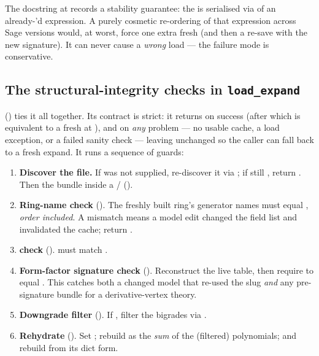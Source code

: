 \begin{note}
The docstring at  records a stability
guarantee: the  is serialised via  of an
already-'d  expression. A purely cosmetic
re-ordering of that expression across Sage versions would, at worst, force one
extra fresh  (and then a re-save with the new signature). It can
never cause a \emph{wrong} load --- the failure mode is conservative.
\end{note}

\subsection{The structural-integrity checks in \texttt{load\_expand}}

 () ties it all
together. Its contract is strict: it returns  on success (after which
 is equivalent to a fresh  at ), and
 on \emph{any} problem --- no usable cache, a load exception, or a
failed sanity check --- leaving  unchanged so the caller can fall back
to a fresh expand. It runs a sequence of guards:

\begin{enumerate}
  \item \textbf{Discover the file.} If  was not supplied,
        re-discover it via ; if still
        , return . Then  the bundle
        inside a / ().
  \item \textbf{Ring-name check} (). The freshly built ring's
        generator names must equal ,
        \emph{order included}. A mismatch means a model edit changed the field
        list and invalidated the cache; return .
  \item \textbf{ check} ().
         must match .
  \item \textbf{Form-factor signature check} (). Reconstruct the
        live table, then require 
        to equal . This catches both a changed
        model that re-used the slug \emph{and} any pre-signature bundle for a
        derivative-vertex theory.
  \item \textbf{Downgrade filter} (). If
        , filter the bigrades via
        .
  \item \textbf{Rehydrate} (). Set
        ;
        rebuild  as the \emph{sum} of the (filtered) 
        polynomials; and rebuild  from its dict form.
\end{enumerate}

